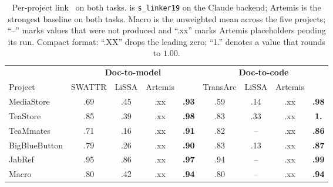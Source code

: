 \begin{table}[t]
\caption{Per-project link \fone\ on both tasks. \approach{} is \texttt{s\_linker19} on the Claude backend; Artemis is the strongest baseline on both tasks. Macro is the unweighted mean across the five projects; ``--'' marks values that were not produced and ``.xx'' marks Artemis placeholders pending its run. Compact format: ``.XX'' drops the leading zero; ``1.'' denotes a value that rounds to $1.00$.}
\label{tab:rq1}
\centering\small
\setlength{\tabcolsep}{4pt}
\begin{tabular}{@{}lcccc@{\hspace{1.0em}}cccc@{}}
\toprule
 & \multicolumn{4}{c}{\textbf{Doc-to-model}} & \multicolumn{4}{c}{\textbf{Doc-to-code}} \\
\cmidrule(lr){2-5}\cmidrule(lr){6-9}
Project        & SWATTR & LiSSA & Artemis & \approach{} & TransArc & LiSSA & Artemis & \approach{} \\
\midrule
MediaStore     & .69 & .45 & .xx & \textbf{.93} & .59 & .14 & .xx & \textbf{.98} \\
TeaStore       & .85 & .39 & .xx & \textbf{.98} & .83 & .33 & .xx & \textbf{1.}  \\
TeaMmates      & .71 & .16 & .xx & \textbf{.91} & .82 & --  & .xx & \textbf{.86} \\
BigBlueButton  & .79 & .26 & .xx & \textbf{.90} & .83 & .13 & .xx & \textbf{.87} \\
JabRef         & .95 & .86 & .xx & \textbf{.97} & .94 & --  & .xx & \textbf{.99} \\
\midrule
Macro          & .80 & .42 & .xx & \textbf{.94} & .80 & --  & .xx & \textbf{.94} \\
\bottomrule
\end{tabular}
\end{table}
